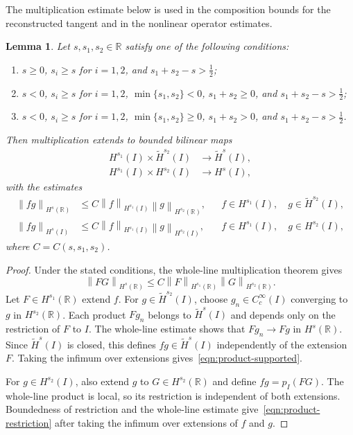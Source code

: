 \documentclass[11pt,reqno]{amsart}
\theoremstyle{plain}
\newtheorem{lemma}[theorem]{Lemma}
\theoremstyle{definition}
\numberwithin{equation}{section}
\newcommand{\wt}[1]{\widetilde{#1}}
\newcommand{\norm}[1]{\left\lVert #1 \right\rVert}
\newcommand{\R}{\mathbb{R}}
\newcommand{\hi}[1]{H^{#1}(I)}
\newcommand{\thi}[1]{\wt H^{#1}(I)}
\newcommand{\hr}[1]{H^{#1}(\R)}
\begin{document}
The multiplication estimate below is used in the composition bounds for
the reconstructed tangent and in the nonlinear operator estimates.

\begin{lemma}\label{point_mult_sobo}
Let $s,s_1,s_2\in\R$ satisfy one of the following conditions:
\begin{enumerate}
    \item $s\ge0$, $s_i\ge s$ for $i=1,2$, and
    $s_1+s_2-s>\frac12$;
    \item $s<0$, $s_i\ge s$ for $i=1,2$, $\min\{s_1,s_2\}<0$,
    $s_1+s_2\ge0$, and $s_1+s_2-s>\frac12$;
    \item $s<0$, $s_i\ge s$ for $i=1,2$, $\min\{s_1,s_2\}\ge0$,
    $s_1+s_2>0$, and $s_1+s_2-s>\frac12$.
\end{enumerate}
Then multiplication extends to bounded bilinear maps
\begin{align*}
    \hi{s_1}\times\thi{s_2}&\longrightarrow\thi{s},\\
    \hi{s_1}\times\hi{s_2}&\longrightarrow\hi{s},
\end{align*}
with the estimates
\begin{align}
    \norm{fg}_{\hr{s}}
    &\le C\norm{f}_{\hi{s_1}}\norm{g}_{\hr{s_2}},
    &&f\in\hi{s_1},\quad g\in\thi{s_2},\label{eqn:product-supported}\\
    \norm{fg}_{\hi{s}}
    &\le C\norm{f}_{\hi{s_1}}\norm{g}_{\hi{s_2}},
    &&f\in\hi{s_1},\quad g\in\hi{s_2},\label{eqn:product-restriction}
\end{align}
where $C=C(s,s_1,s_2)$.
\end{lemma}
\begin{proof}
Under the stated conditions, the whole-line multiplication theorem
\cite[Theorems~7.3, 8.1, and~8.2]{Behzadan2021} gives
\begin{equation*}
    \norm{FG}_{\hr{s}}
    \le C\norm{F}_{\hr{s_1}}\norm{G}_{\hr{s_2}}.
\end{equation*}
Let $F\in\hr{s_1}$ extend $f$. For $g\in\thi{s_2}$, choose
$g_n\in C_c^\infty(I)$ converging to $g$ in $\hr{s_2}$.
Each product $Fg_n$ belongs to $\thi{s}$ and depends only on the
restriction of $F$ to $I$. The whole-line estimate shows that
$Fg_n\to Fg$ in $\hr{s}$. Since $\thi{s}$ is closed, this defines
$fg\in\thi{s}$ independently of the extension $F$. Taking the infimum
over extensions gives~\eqref{eqn:product-supported}.

For $g\in\hi{s_2}$, also extend $g$ to $G\in\hr{s_2}$ and define
$fg=p_I(FG)$. The whole-line product is local, so its restriction is
independent of both extensions. Boundedness of restriction and the
whole-line estimate give~\eqref{eqn:product-restriction} after taking the infimum
over extensions of $f$ and $g$.
\end{proof}
\end{document}
